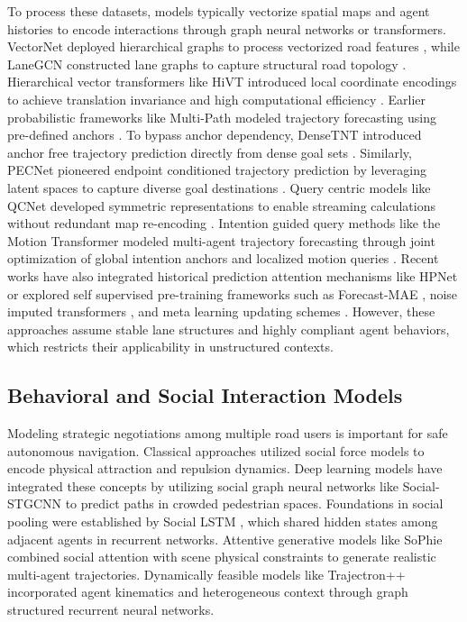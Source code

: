 \documentclass{article}
\begin{document}
To process these datasets, models typically vectorize spatial maps and agent histories to encode interactions through graph neural networks or transformers. VectorNet deployed hierarchical graphs to process vectorized road features \cite{b16}, while LaneGCN constructed lane graphs to capture structural road topology \cite{b18}. Hierarchical vector transformers like HiVT introduced local coordinate encodings to achieve translation invariance and high computational efficiency \cite{b17}. Earlier probabilistic frameworks like Multi-Path modeled trajectory forecasting using pre-defined anchors \cite{b24}. To bypass anchor dependency, DenseTNT introduced anchor free trajectory prediction directly from dense goal sets \cite{b25}. Similarly, PECNet pioneered endpoint conditioned trajectory prediction by leveraging latent spaces to capture diverse goal destinations \cite{b32}. Query centric models like QCNet developed symmetric representations to enable streaming calculations without redundant map re-encoding \cite{b27}. Intention guided query methods like the Motion Transformer modeled multi-agent trajectory forecasting through joint optimization of global intention anchors and localized motion queries \cite{b28}. Recent works have also integrated historical prediction attention mechanisms like HPNet \cite{b5} or explored self supervised pre-training frameworks such as Forecast-MAE \cite{b7}, noise imputed transformers \cite{b6}, and meta learning updating schemes \cite{b8}. However, these approaches assume stable lane structures and highly compliant agent behaviors, which restricts their applicability in unstructured contexts.

\subsection{Behavioral and Social Interaction Models}
Modeling strategic negotiations among multiple road users is important for safe autonomous navigation. Classical approaches utilized social force models \cite{b9} to encode physical attraction and repulsion dynamics. Deep learning models have integrated these concepts by utilizing social graph neural networks like Social-STGCNN \cite{b4} to predict paths in crowded pedestrian spaces. Foundations in social pooling were established by Social LSTM \cite{b31}, which shared hidden states among adjacent agents in recurrent networks. Attentive generative models like SoPhie \cite{b33} combined social attention with scene physical constraints to generate realistic multi-agent trajectories. Dynamically feasible models like Trajectron++ \cite{b29} incorporated agent kinematics and heterogeneous context through graph structured recurrent neural networks.
\end{document}
